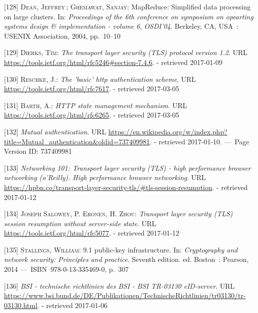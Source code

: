 \documentclass[12pt,english,a4paper,titlepage,cleardoublepage=empty,dottedtoc]{report}
\begin{document}
\hypertarget{ref-paper_2004_distributed-mapreduce}{}
{[}128{]} \textsc{Dean, Jeffrey}\,; \textsc{Ghemawat, Sanjay}:
MapReduce: Simplified data processing on large clusters. In:
\emph{Proceedings of the 6th conference on symposium on opearting
systems design \& implementation - volume 6}, \emph{OSDI'04}. Berkeley,
CA, USA~: USENIX Association, 2004, pp.~10--10

\hypertarget{ref-web_spec_tls-12_client-auth}{}
{[}129{]} \textsc{Dierks, Tim}: \emph{The transport layer security (TLS)
protocol version 1.2}. URL
\url{https://tools.ietf.org/html/rfc5246\#section-7.4.6}. - retrieved
2017-01-09

\hypertarget{ref-web_spec_basic-auth}{}
{[}130{]} \textsc{Reschke, J.}: \emph{The 'basic' http authentication
scheme}. URL \url{https://tools.ietf.org/html/rfc7617}. - retrieved
2017-03-05

\hypertarget{ref-web_spec_cookie}{}
{[}131{]} \textsc{Barth, A.}: \emph{HTTP state management mechanism}.
URL \url{https://tools.ietf.org/html/rfc6265}. - retrieved 2017-03-05

\hypertarget{ref-web_2017_wikipedia_mutual-auth}{}
{[}132{]} \emph{Mutual authentication}. URL
\url{https://en.wikipedia.org/w/index.php?title=Mutual_authentication\&oldid=737409981}.
- retrieved 2017-01-10. ---~Page Version ID: 737409981

\hypertarget{ref-book_2013_networking-101_tls-session-resumption}{}
{[}133{]} \emph{Networking 101: Transport layer security (TLS) - high
performance browser networking (o'Reilly). High performance browser
networking}. URL
\url{https://hpbn.co/transport-layer-security-tls/\#tls-session-resumption}.
- retrieved 2017-01-12

\hypertarget{ref-web_spec_tls-session-ticket-resumption}{}
{[}134{]} \textsc{Joseph Salowey, P. Eronen, \textnormal{H. Zhou}}:
\emph{Transport layer security (TLS) session resumption without
server-side state}. URL \url{https://tools.ietf.org/html/rfc5077}. -
retrieved 2017-01-12

\hypertarget{ref-book_2014_chapter-10-5-asym-random-number-gen}{}
{[}135{]} \textsc{Stallings, William}: 9.1 public-key infrastructure.
In: \emph{Cryptography and network security: Principles and practice}.
Seventh edition. ed. Boston~: Pearson, 2014 ---~ISBN~978-0-13-335469-0,
p.~307

\hypertarget{ref-web_bsi-spec_eid}{}
{[}136{]} \emph{BSI - technische richtlinien des BSI - BSI TR-03130
eID-server}. URL
\url{https://www.bsi.bund.de/DE/Publikationen/TechnischeRichtlinien/tr03130/tr-03130.html}.
- retrieved 2017-01-06
\end{document}
